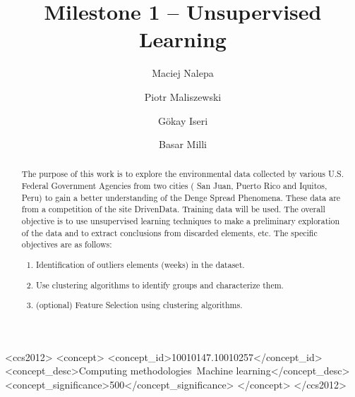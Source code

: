 \documentclass[sigconf]{acmart}
\begin{document}
\title{Milestone 1 -- Unsupervised Learning}

\author{Maciej Nalepa}
\affiliation{}

\author{Piotr Maliszewski}
\affiliation{}

\author{Gökay Iseri}
\affiliation{}

\author{Basar Milli}
\affiliation{}

\renewcommand{\shortauthors}{Nalepa Maliszewski Iseri Milli}

\begin{abstract}
The purpose of this work is to explore the environmental data collected by various U.S.
Federal Government Agencies from two cities ( San Juan, Puerto Rico and Iquitos, Peru) to
gain a better understanding of the Denge Spread Phenomena.
These data are from a competition of the site DrivenData. Training data will be used.
The overall objective is to use unsupervised learning techniques to make a preliminary exploration of the data and to extract conclusions from discarded elements, etc. The specific
objectives are as follows:

\begin{enumerate}
    \item Identification of outliers elements (weeks) in the dataset.
    \item Use clustering algorithms to identify groups and characterize them.
    \item (optional) Feature Selection using clustering algorithms.
\end{enumerate}

\end{abstract}

\begin{CCSXML}
<ccs2012>
   <concept>
       <concept_id>10010147.10010257</concept_id>
       <concept_desc>Computing methodologies~Machine learning</concept_desc>
       <concept_significance>500</concept_significance>
       </concept>
 </ccs2012>
\end{CCSXML}



\maketitle
\end{document}
